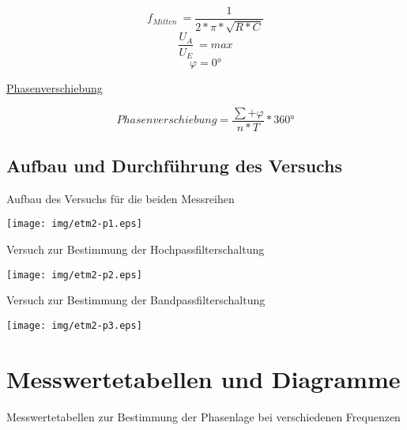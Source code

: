 \documentclass[footsepline,11pt,oneside,a4paper]{scrartcl}
\begin{document}
\begin{displaymath}
f_{Mitten}\ = \frac{1}{2* \pi * \sqrt{R * C}}
\end{displaymath}
\newline
\newline
\begin{displaymath}
\frac{U_{A}}{U_{E}}\  = max 
\end{displaymath}
\newline
\begin{displaymath}
\varphi = 0°
\end{displaymath}
\newline
\newline
\newline
\begin{center}
\underline{Phasenverschiebung}
\end{center}
\newline
\begin{displaymath}
Phasenverschiebung = \frac{\sum + \varphi}{ n * T} * 360°
\end{displaymath}
\newline
\newpage

\subsection{Aufbau und Durchführung des Versuchs}
\newline
\begin{center}
Aufbau des Versuchs für die beiden Messreihen
\end{center}
\newline
\texttt{[image: img/etm2-p1.eps]} 
\newline
\begin{center}
Versuch zur Bestimmung der Hochpassfilterschaltung
\end{center}
\newline
\texttt{[image: img/etm2-p2.eps]}
\newline
\begin{center}
Versuch zur Bestimmung der Bandpassfilterschaltung
\end{center}
\newline
\texttt{[image: img/etm2-p3.eps]}
\newpage
\section{Messwertetabellen und Diagramme }
\newline
\newline
Messwertetabellen zur Bestimmung der Phasenlage bei verschiedenen Frequenzen
\newline
\end{document}
